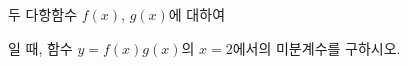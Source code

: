 두 다항함수 $f(x)$, $g(x)$에 대하여 \par\smallskip{}\par\smallskip\noindent 일 때, 함수 $y=f(x)g(x)$의 $x=2$에서의 미분계수를 구하시오.
